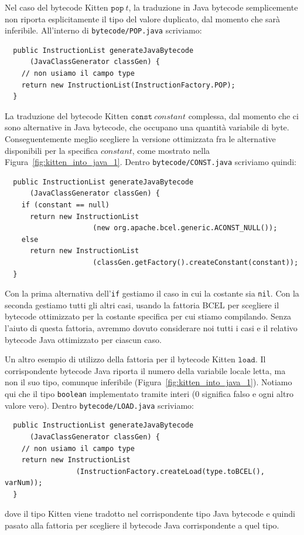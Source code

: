 Nel caso del bytecode Kitten $\mathtt{pop}\ \mathit{t}$, la traduzione in Java bytecode
semplicemente non riporta esplicitamente il tipo del valore duplicato, dal momento che sar\`a
inferibile. All'interno di \texttt{bytecode/POP.java} scriviamo:
%
\begin{verbatim}
  public InstructionList generateJavaBytecode
      (JavaClassGenerator classGen) {
    // non usiamo il campo type
    return new InstructionList(InstructionFactory.POP);
  }
\end{verbatim}
%
La traduzione del bytecode Kitten $\mathtt{const}\ \mathit{constant}$ \e \piu complessa,
dal momento che ci sono \piu alternative in Java bytecode, che occupano una quantit\`a
variabile di byte. Conseguentemente \e meglio scegliere la versione \piu ottimizzata fra le alternative
disponibili per la specifica $\mathit{constant}$,
come mostrato nella Figura~\ref{fig:kitten_into_java_1}. Dentro
\texttt{bytecode/CONST.java} scriviamo quindi:
%
\begin{verbatim}
  public InstructionList generateJavaBytecode
      (JavaClassGenerator classGen) {
    if (constant == null)
      return new InstructionList
                     (new org.apache.bcel.generic.ACONST_NULL());
    else
      return new InstructionList
                     (classGen.getFactory().createConstant(constant));
  }
\end{verbatim}
%
Con la prima alternativa dell'\texttt{if} gestiamo il caso in cui la costante sia \texttt{nil}.
Con la seconda gestiamo tutti gli altri casi, usando la fattoria BCEL per scegliere il bytecode
\piu ottimizzato per la costante specifica per cui stiamo compilando. Senza l'aiuto di questa fattoria,
avremmo dovuto considerare noi tutti i casi e il relativo bytecode Java \piu ottimizzato per
ciascun caso.

Un altro esempio di utilizzo della fattoria \e per il bytecode Kitten $\mathtt{load}$. Il
corrispondente bytecode Java riporta il numero della variabile locale letta, ma non il suo tipo,
\poiche \e comunque inferibile (Figura~\ref{fig:kitten_into_java_1}). Notiamo qui che
il tipo \texttt{boolean} \e implementato tramite interi (0 significa falso e ogni altro valore vero).
Dentro \texttt{bytecode/LOAD.java} scriviamo:
%
\begin{verbatim}
  public InstructionList generateJavaBytecode
      (JavaClassGenerator classGen) {
    // non usiamo il campo type
    return new InstructionList
                 (InstructionFactory.createLoad(type.toBCEL(), varNum));
  }
\end{verbatim}
%
dove il tipo Kitten viene tradotto nel corrispondente tipo Java bytecode e quindi pasato
alla fattoria per scegliere il bytecode Java corrispondente a quel tipo.

